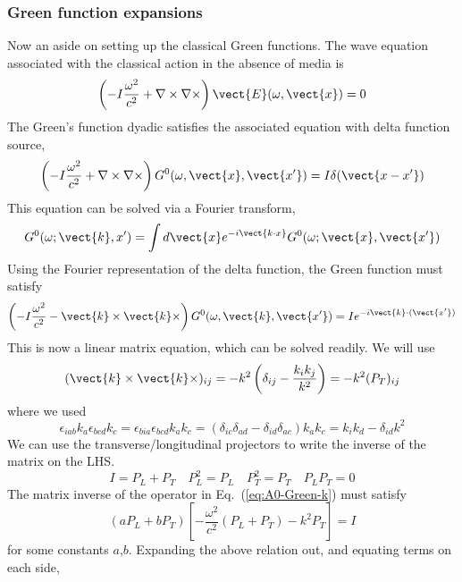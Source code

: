 \subsubsection{Green function expansions}
Now an aside on setting up the classical Green functions.
The wave equation associated with the classical action in the absence of media is
\begin{equation}
\left(-I\frac{\omega^2}{c^2}+\nabla\times\nabla\times\right)\vect{E}(\omega,\vect{x})=0
\end{equation}
The Green's function dyadic satisfies the associated equation with delta function source,
\begin{equation}
\left(-I\frac{\omega^2}{c^2}+\nabla\times\nabla\times\right)G^0(\omega,\vect{x},\vect{x'})=I\delta(\vect{x-x'})
\label{eq:A0-Green-x}
\end{equation}
This equation can be solved via a Fourier transform,
\begin{equation}
  G^0(\omega;\vect{k},x')=\int d\vect{x} e^{-i\vect{k\cdot x}} G^0(\omega;\vect{x},\vect{x'})
\end{equation}
Using the Fourier representation of the delta function, the Green function must satisfy
\begin{equation}
\left(-I\frac{\omega^2}{c^2}-\vect{k}\times\vect{k}\times\right)G^0(\omega,\vect{k},\vect{x'})
=Ie^{-i\vect{k}\cdot(\vect{x'})}\label{eq:A0-Green-k}
\end{equation}
This is now a linear matrix equation, which can be solved readily.  We will use 
\begin{equation}
(\vect{k}\times\vect{k}\times)_{ij}=-k^2\left(\delta_{ij}-\frac{k_ik_j}{k^2}\right)=-k^2(P_T)_{ij}
\end{equation}
where we used
\begin{equation}
  \epsilon_{iab}k_a\epsilon_{bcd}k_c = \epsilon_{bia}\epsilon_{bcd}k_ak_c 
= (\delta_{ic}\delta_{ad}-\delta_{id}\delta_{ac})k_ak_c
= k_ik_d-\delta_{id}k^2
\end{equation}
We can use the transverse/longitudinal projectors to write the inverse of the matrix on the LHS. 
\begin{equation}
  I = P_L + P_T \quad P_L^2=P_L\quad P_T^2=P_T\quad P_LP_T=0
\end{equation}
The matrix inverse of the operator in Eq.~(\ref{eq:A0-Green-k}) must satisfy
\begin{equation}
  (aP_L + b P_T)[-\frac{\omega^2}{c^2}(P_L+P_T)-k^2P_T]=I
\end{equation}
for some constants $a$,$b$.  Expanding the above relation out, and equating terms on each side,
